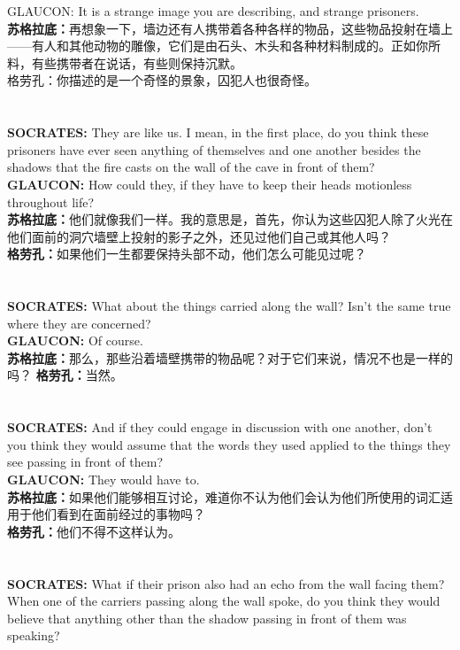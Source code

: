 \documentclass{article}
\begin{document}
GLAUCON: It is a strange image you are describing, and strange prisoners.\\
\textbf{苏格拉底：}再想象一下，墙边还有人携带着各种各样的物品，这些物品投射在墙上——有人和其他动物的雕像，它们是由石头、木头和各种材料制成的。正如你所料，有些携带者在说话，有些则保持沉默。\\
格劳孔：你描述的是一个奇怪的景象，囚犯人也很奇怪。\\
\\\\
\textbf{SOCRATES:} They are like us. I mean, in the first place, do you think these prisoners have ever seen anything of themselves and one another besides the shadows that the fire casts on the wall of the cave in front of them?
\textbf{GLAUCON: }How could they, if they have to keep their heads motionless throughout life?\\
\textbf{苏格拉底：}他们就像我们一样。我的意思是，首先，你认为这些囚犯人除了火光在他们面前的洞穴墙壁上投射的影子之外，还见过他们自己或其他人吗？\\
\textbf{格劳孔：}如果他们一生都要保持头部不动，他们怎么可能见过呢？\\
\\
\\
\textbf{SOCRATES: }What about the things carried along the wall? Isn't the same true where they are concerned?\\
\textbf{GLAUCON:} Of course.\\
\textbf{苏格拉底：}那么，那些沿着墙壁携带的物品呢？对于它们来说，情况不也是一样的吗？
\textbf{格劳孔：}当然。\\
\\
\\
\textbf{SOCRATES: }And if they could engage in discussion with one another, don't you think they would assume that the words they used applied to the things they see passing in front of them?\\
\textbf{GLAUCON: }They would have to.\\
\textbf{苏格拉底：}如果他们能够相互讨论，难道你不认为他们会认为他们所使用的词汇适用于他们看到在面前经过的事物吗？\\
\textbf{格劳孔：}他们不得不这样认为。\\
\\\\
\textbf{SOCRATES: }What if their prison also had an echo from the wall facing them? When one of the carriers passing along the wall spoke, do you think they would believe that anything other than the shadow passing in front of them was speaking?\\
\end{document}
